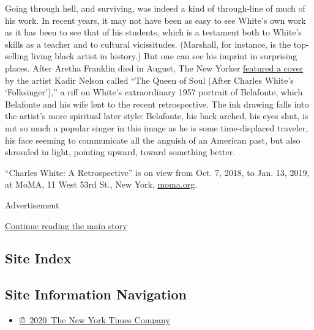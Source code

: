 Going through hell, and surviving, was indeed a kind of through-line of
much of his work. In recent years, it may not have been as easy to see
White's own work as it has been to see that of his students, which is a
testament both to White's skills as a teacher and to cultural
vicissitudes. (Marshall, for instance, is the top-selling living black
artist in history.) But one can see his imprint in surprising places.
After Aretha Franklin died in August, The New Yorker
\href{https://www.newyorker.com/culture/cover-story/cover-story-2018-08-27}{featured
a cover} by the artist Kadir Nelson called ``The Queen of Soul (After
Charles White's `Folksinger'),'' a riff on White's extraordinary 1957
portrait of Belafonte, which Belafonte and his wife lent to the recent
retrospective. The ink drawing falls into the artist's more spiritual
later style: Belafonte, his back arched, his eyes shut, is not so much a
popular singer in this image as he is some time-displaced traveler, his
face seeming to communicate all the anguish of an American past, but
also shrouded in light, pointing upward, toward something better.

``Charles White: A Retrospective'' is on view from Oct. 7, 2018, to Jan.
13, 2019, at MoMA, 11 West 53rd St., New York,
\href{https://www.moma.org/calendar/exhibitions/3930}{moma.org}.

Advertisement

\protect\hyperlink{after-bottom}{Continue reading the main story}

\hypertarget{site-index}{%
\subsection{Site Index}\label{site-index}}

\hypertarget{site-information-navigation}{%
\subsection{Site Information
Navigation}\label{site-information-navigation}}

\begin{itemize}
\tightlist
\item
  \href{https://help.nytimes.com/hc/en-us/articles/115014792127-Copyright-notice}{©~2020~The
  New York Times Company}
\end{itemize}

